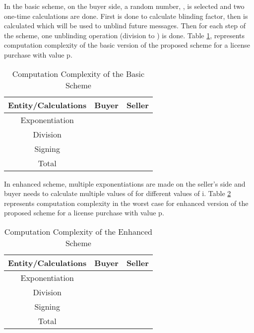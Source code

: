 \documentclass[times]{secauth}
\begin{document}
In the basic scheme, on the buyer side, a random number, , is selected and two one-time calculations are done. First  is done to calculate blinding factor, then  is calculated which will be used to unblind future messages. Then for each step of the scheme, one unblinding operation (division to ) is done.
Table \ref{table:basic_communication}, represents computation complexity of the basic version of the proposed scheme for a license purchase with value p.

\begin{table}
\caption{Computation Complexity of the Basic Scheme}
\begin{tabular}{|c|c|c|}
\hline \textbf{Entity/Calculations} & \textbf{Buyer} & \textbf{Seller} \\ 
\hline Exponentiation &  &  \\ 
\hline Division &  &  \\ 
\hline Signing &  &  \\ 
\hline Total &  &  \\ 
\hline 
\end{tabular} 
\label{table:basic_communication}
\end{table}

In enhanced scheme, multiple exponentiations are made on the seller's side and buyer needs to calculate multiple values of  for different values of i. Table \ref{table:enhanced_communication} represents computation complexity in the worst case for enhanced version of the proposed scheme for a license purchase with value p. 

\begin{table}
\caption{Computation Complexity of the Enhanced Scheme}
\begin{tabular}{|c|c|c|}
\hline \textbf{Entity/Calculations} & \textbf{Buyer} & \textbf{Seller} \\ 
\hline Exponentiation &  &  \\ 
\hline Division &  &  \\ 
\hline Signing &  &  \\ 
\hline Total &  &  \\ 
\hline 
\end{tabular} 
\label{table:enhanced_communication}
\end{table}
\end{document}
